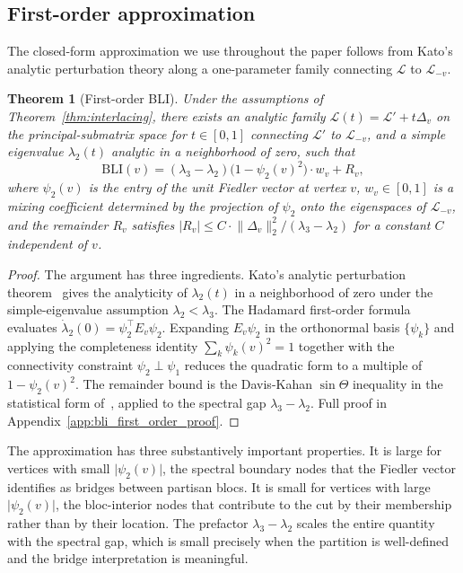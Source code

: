 \documentclass[12pt, a4paper]{article}
\newtheorem{theorem}{Theorem}
\begin{document}
\subsection{First-order approximation}\label{subsec:bli_first_order}

The closed-form approximation we use throughout the paper follows from Kato's analytic perturbation theory along a one-parameter family connecting $\mathcal{L}$ to $\mathcal{L}_{-v}$.

\begin{theorem}[First-order BLI]\label{thm:first_order}
Under the assumptions of Theorem~\ref{thm:interlacing}, there exists an analytic family $\mathcal{L}(t) = \mathcal{L}' + t \Delta_v$ on the principal-submatrix space for $t \in [0, 1]$ connecting $\mathcal{L}'$ to $\mathcal{L}_{-v}$, and a simple eigenvalue $\lambda_2(t)$ analytic in a neighborhood of zero, such that
\begin{equation}
\mathrm{BLI}(v) = (\lambda_3 - \lambda_2)\bigl(1 - \psi_2(v)^2\bigr) \cdot w_v + R_v,
\end{equation}
where $\psi_2(v)$ is the entry of the unit Fiedler vector at vertex $v$, $w_v \in [0, 1]$ is a mixing coefficient determined by the projection of $\psi_2$ onto the eigenspaces of $\mathcal{L}_{-v}$, and the remainder $R_v$ satisfies $\lvert R_v \rvert \leq C \cdot \lVert \Delta_v \rVert_2^2 / (\lambda_3 - \lambda_2)$ for a constant $C$ independent of $v$.
\end{theorem}

\begin{proof}
The argument has three ingredients. Kato's analytic perturbation theorem~\citep[Ch.\ II \S 1]{kato1995perturbation} gives the analyticity of $\lambda_2(t)$ in a neighborhood of zero under the simple-eigenvalue assumption $\lambda_2 < \lambda_3$. The Hadamard first-order formula~\citep{magnus1985differentiating} evaluates $\dot\lambda_2(0) = \psi_2^\top E_v \psi_2$. Expanding $E_v \psi_2$ in the orthonormal basis $\{\psi_k\}$ and applying the completeness identity $\sum_k \psi_k(v)^2 = 1$ together with the connectivity constraint $\psi_2 \perp \psi_1$ reduces the quadratic form to a multiple of $1 - \psi_2(v)^2$. The remainder bound is the Davis-Kahan $\sin\Theta$ inequality in the statistical form of~\citet{yu2015useful}, applied to the spectral gap $\lambda_3 - \lambda_2$. Full proof in Appendix~\ref{app:bli_first_order_proof}.
\end{proof}

The approximation has three substantively important properties. It is large for vertices with small $\lvert \psi_2(v) \rvert$, the spectral boundary nodes that the Fiedler vector identifies as bridges between partisan blocs. It is small for vertices with large $\lvert \psi_2(v) \rvert$, the bloc-interior nodes that contribute to the cut by their membership rather than by their location. The prefactor $\lambda_3 - \lambda_2$ scales the entire quantity with the spectral gap, which is small precisely when the partition is well-defined and the bridge interpretation is meaningful.
\end{document}
